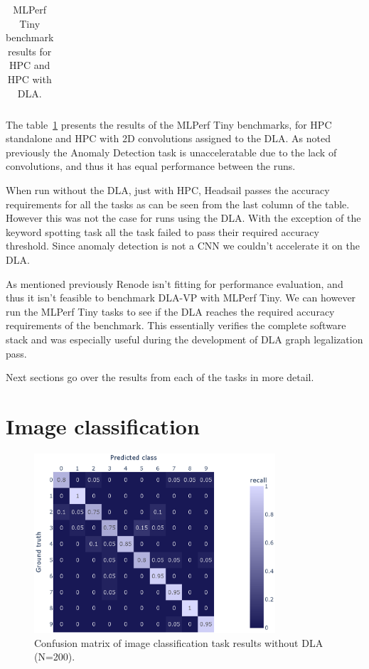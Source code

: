 \documentclass[12pt,a4paper,english
]{tunithesis}
\begin{document}
\begin{table}[h]
\begin{tabular}{|l|l|c|c|c|c|}
\end{tabular}
\caption{MLPerf Tiny benchmark results for HPC and HPC with DLA.}
\label{tab:benchmark-results}
\end{table}

The table~\ref{tab:benchmark-results} presents the results of the MLPerf Tiny benchmarks, for HPC standalone and HPC with 2D convolutions assigned to the DLA. As noted previously the Anomaly Detection task is unacceleratable due to the lack of convolutions, and thus it has equal performance between the runs.

When run without the DLA, just with HPC, Headsail passes the accuracy requirements for all the tasks as can be seen from the last column of the table. However this was not the case for runs using the DLA. With the exception of the keyword spotting task all the task failed to pass their required accuracy threshold. Since anomaly detection is not a CNN we couldn't accelerate it on the DLA.

As mentioned previously Renode isn't fitting for performance evaluation, and thus it isn't feasible to benchmark DLA-VP with MLPerf Tiny. We can however run the MLPerf Tiny tasks to see if the DLA reaches the required accuracy requirements of the benchmark. This essentially verifies the complete software stack and was especially useful during the development of DLA graph legalization pass.

Next sections go over the results from each of the tasks in more detail.

\section{Image classification}
\begin{figure}[h]
  \centering
  \includegraphics[width=0.8\textwidth]{img/ic_200_no_acc.eps}
  \caption{Confusion matrix of image classification task results without DLA (N=200).}
  \label{fig:ic-results-no-acc}
\end{figure}
\end{document}
